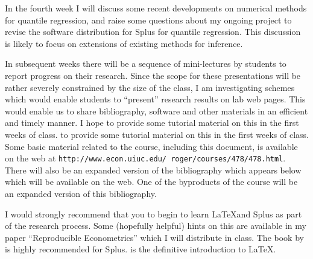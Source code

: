 In the fourth week I will discuss some recent developments on numerical
methods for quantile regression, and raise some questions about my
ongoing project to revise the software distribution for Splus for
quantile regression.  This discussion is likely to focus on extensions
of existing methods for inference.

In subsequent weeks there will be a sequence of mini-lectures by students
to report progress on their research.  Since the scope for these
presentations will be rather severely constrained by the size of the
class, I am investigating schemes which would enable students to ``present''
research results on lab web pages.  This would enable us to share bibliography,
software and other materials in an efficient and timely manner.  I hope
to provide some tutorial material on this in the first weeks of class.
to provide some tutorial material on this in the first weeks of class.
Some basic material related to the course, including this document, is
available on the web at
{\tt http://www.econ.uiuc.edu/~roger/courses/478/478.html}.
There will also be an expanded version of the bibliography 
which appears below which will
be available on the web.  One of the byproducts of the course
will be an expanded version of this bibliography. 




I would strongly recommend that you to begin to 
learn \LaTeX and Splus as part of
the research process. Some (hopefully helpful) hints on this are
available in my paper ``Reproducible Econometrics'' which I will distribute
in class.  
The book by \cite{VR:1997}  is highly recommended
for Splus.  \cite{Lamp:1994} is the definitive introduction to \LaTeX.



